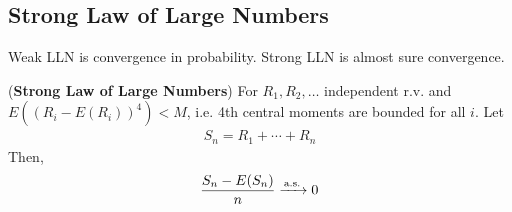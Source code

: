 \subsection{Strong Law of Large Numbers}
\begin{aside}
    Weak LLN is convergence in probability. Strong LLN is almost sure convergence.
\end{aside}

\begin{theorem}
    (\textbf{Strong Law of Large Numbers}) For $R_1, R_2, \ldots$ independent r.v. and $E((R_i - E(R_i))^4) < M$, i.e. 4th central moments are bounded for all $i$. Let
    \begin{align}
        S_n = R_1 + \cdots + R_n
    \end{align}
    Then,
    \begin{align}
        \frac{S_n - E(S_n)}{n} \ce{->[\text{a.s.}]} 0
    \end{align}
\end{theorem}


